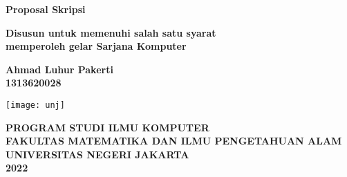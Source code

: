 \begin{titlepage}
	\begin{center}
		\LARGE
		\textbf{\judul}
		
		\vspace{0.5cm}
		\Large
		\textbf{Proposal Skripsi}
		
		\vspace{0.5cm}
		
		\large
		\textbf{Disusun untuk memenuhi salah satu syarat\\
		memperoleh gelar Sarjana Komputer}
		
		\vspace{0.5cm}
		
		\textbf{Ahmad Luhur Pakerti}\\
		\textbf{1313620028}
		
		\vspace{1.2cm}
		
		\texttt{[image: unj]}
		
		\vfill

		\textbf{\MakeUppercase{Program Studi Ilmu Komputer}}\\
		\textbf{\normalsize \MakeUppercase{Fakultas Matematika dan Ilmu Pengetahuan Alam}}\\
		\textbf{\MakeUppercase{Universitas Negeri Jakarta}}\\
		\textbf{2022}
	\end{center}
\end{titlepage}